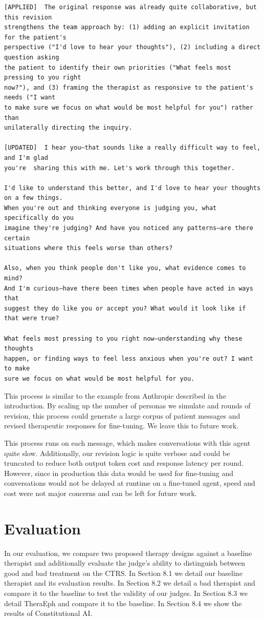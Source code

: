 \documentclass[twoside]{report}
\begin{document}
\begin{Verbatim}
[APPLIED]  The original response was already quite collaborative, but this revision 
strengthens the team approach by: (1) adding an explicit invitation for the patient's 
perspective ("I'd love to hear your thoughts"), (2) including a direct question asking 
the patient to identify their own priorities ("What feels most pressing to you right 
now?"), and (3) framing the therapist as responsive to the patient's needs ("I want 
to make sure we focus on what would be most helpful for you") rather than 
unilaterally directing the inquiry.

[UPDATED]  I hear you—that sounds like a really difficult way to feel, and I'm glad 
you're  sharing this with me. Let's work through this together.

I'd like to understand this better, and I'd love to hear your thoughts on a few things. 
When you're out and thinking everyone is judging you, what specifically do you 
imagine they're judging? And have you noticed any patterns—are there certain 
situations where this feels worse than others?

Also, when you think people don't like you, what evidence comes to mind? 
And I'm curious—have there been times when people have acted in ways that 
suggest they do like you or accept you? What would it look like if that were true?

What feels most pressing to you right now—understanding why these thoughts 
happen, or finding ways to feel less anxious when you're out? I want to make 
sure we focus on what would be most helpful for you.
\end{Verbatim}

This process is similar to the example from Anthropic described in the introduction. By scaling up the number of personas we simulate and rounds of revision, this process could generate a large corpus of patient messages and revised therapeutic responses for fine-tuning. We leave this to future work.

This process runs on each message, which makes conversations with this agent quite slow. Additionally, our revision logic is quite verbose and could be truncated to reduce both output token cost and response latency per round. However, since in production this data would be used for fine-tuning and conversations would not be delayed at runtime on a fine-tuned agent, speed and cost were not major concerns and can be left for future work.

\chapter{Evaluation}
In our evaluation, we compare two proposed therapy designs against a baseline therapist and additionally evaluate the judge's ability to distinguish between good and bad treatment on the CTRS. In Section 8.1 we detail our baseline therapist and its evaluation results. In Section 8.2 we detail a bad therapist and compare it to the baseline to test the validity of our judges. In Section 8.3 we detail TheraEph and compare it to the baseline. In Section 8.4 we show the results of Constitutional AI.
\end{document}
